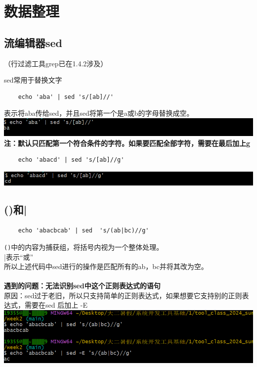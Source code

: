 \documentclass[UTF8,a4paper]{ctexart}
\begin{document}
\section{数据整理}
\subsection{流编辑器sed}
（行过滤工具grep已在1.4.2涉及）\par
sed常用于替换文字
\begin{lstlisting}
    echo 'aba' | sed 's/[ab]//'  
\end{lstlisting}
表示将aba传给sed，并且sed将第一个是a或b的字母替换成空。\\
\includegraphics[width=1\textwidth]{./pictures/sed1.png}
\textbf{注：默认只匹配第一个符合条件的字符。如果要匹配全部字符，需要在最后加上g}
\begin{lstlisting}
    echo 'abacd' | sed 's/[ab]//g'  
\end{lstlisting}
\includegraphics[width=1\textwidth]{./pictures/sed2.png}

\subsection{()和|}
\begin{lstlisting}
    echo 'abacbcab' | sed  's/(ab|bc)//g'  
\end{lstlisting}
\verb|()|中的内容为捕获组，将括号内视为一个整体处理。\\|表示“或”\\
所以上述代码中sed进行的操作是匹配所有的ab，bc并将其改为空。\\
\\
\textbf{遇到的问题：无法识别sed中这个正则表达式的语句}\\
原因：sed过于老旧，所以只支持简单的正则表达式，如果想要它支持别的正则表达式，需要在sed 后加上 -E\\
\includegraphics[width=1\textwidth]{./pictures/sed3.png}
\end{document}
